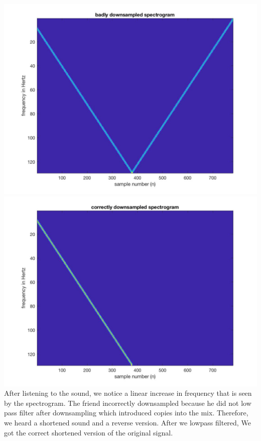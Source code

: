 \documentclass{article}
\begin{document}
\includegraphics[scale = .5]{Blackdog2}
\includegraphics[scale = .5]{Blackdog3}
After listening to the sound, we notice a linear increase in frequency that is seen by the spectrogram. The friend incorrectly downsampled because he did not low pass filter after downsampling which introduced copies into the mix.
Therefore, we heard a shortened sound and a reverse version. After we lowpass filtered, We got the correct shortened version of the original signal.
\end{document}

